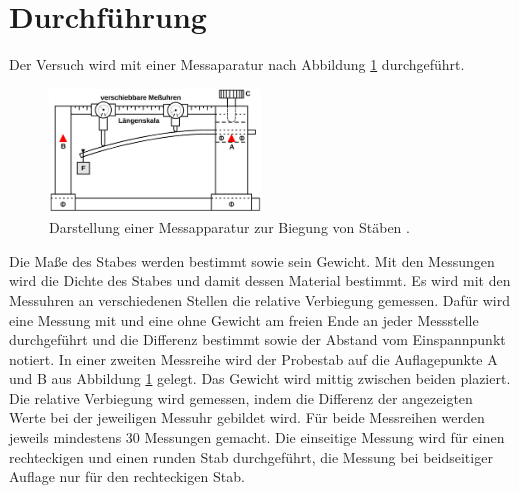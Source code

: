 \section{Durchführung}
\label{sec:Durchführung}
Der Versuch wird mit einer Messaparatur nach Abbildung \ref{fig:Messapparatur}
durchgeführt.
\begin{figure}[H]
  \centering
  \includegraphics[width=0.5\textwidth]{Messapparatur.png}
  \caption{Darstellung einer Messapparatur zur Biegung von Stäben \cite{sample} .}
  \label{fig:Messapparatur}
\end{figure} 
Die Maße des Stabes werden bestimmt sowie sein Gewicht. Mit den Messungen wird die
Dichte des Stabes und damit dessen Material bestimmt. Es wird mit den Messuhren
an verschiedenen Stellen die relative Verbiegung gemessen. Dafür wird
eine Messung mit und eine ohne Gewicht am freien Ende an jeder Messstelle
durchgeführt und die Differenz bestimmt sowie der Abstand vom Einspannpunkt notiert.
In einer zweiten Messreihe wird der Probestab auf die Auflagepunkte A und B aus
Abbildung \ref{fig:Messapparatur} gelegt. Das Gewicht wird mittig zwischen beiden
plaziert. Die relative Verbiegung wird gemessen, indem die Differenz der angezeigten
Werte bei der jeweiligen Messuhr gebildet wird. Für beide Messreihen werden
jeweils mindestens 30 Messungen gemacht. Die einseitige Messung wird für einen
 rechteckigen und einen runden Stab durchgeführt, die Messung bei beidseitiger
 Auflage nur für den rechteckigen Stab.
